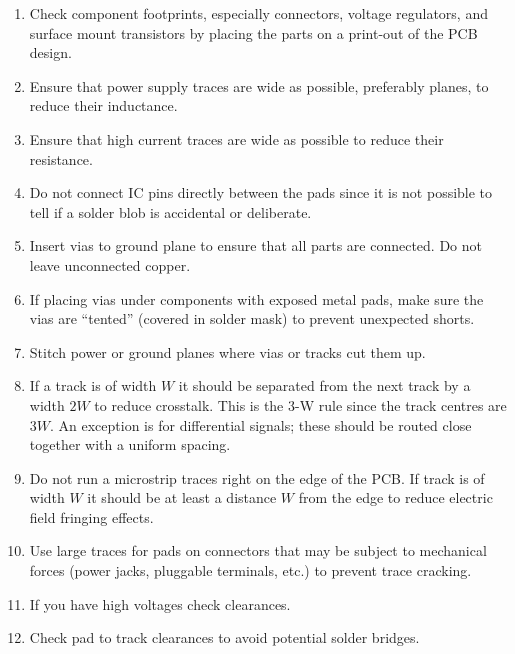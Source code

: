 \begin{enumerate}
\item Check component footprints, especially connectors, voltage
  regulators, and surface mount transistors by placing the parts on a
  print-out of the PCB design.

\item Ensure that power supply traces are wide as possible, preferably
  planes, to reduce their inductance.

\item Ensure that high current traces are wide as possible to reduce their resistance.

\item Do not connect IC pins directly between the pads since it is not
  possible to tell if a solder blob is accidental or deliberate.

\item Insert vias to ground plane to ensure that all parts are
  connected.  Do not leave unconnected copper.


\item If placing vias under components with exposed metal pads, make
  sure the vias are ``tented'' (covered in solder mask) to prevent
  unexpected shorts.

\item Stitch power or ground planes where vias or tracks cut them up.

\item If a track is of width $W$ it should be separated from the next
  track by a width $2W$ to reduce crosstalk.  This is the 3-W rule
  since the track centres are $3W$.  An exception is for differential
  signals; these should be routed close together with a uniform
  spacing.

\item Do not run a microstrip traces right on the edge of the PCB.  If
  track is of width $W$ it should be at least a distance $W$ from the
  edge to reduce electric field fringing effects.

\item Use large traces for pads on connectors that may be subject to
  mechanical forces (power jacks, pluggable terminals, etc.) to
  prevent trace cracking.

\item If you have high voltages check clearances.

\item Check pad to track clearances to avoid potential solder bridges.


\end{enumerate}
